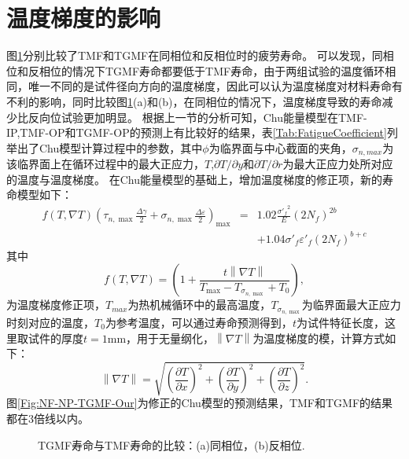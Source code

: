 \section{温度梯度的影响}
图\ref{Fig:plot_exp_fatigue_life_TMF_TGMF}分别比较了TMF和TGMF在同相位和反相位时的疲劳寿命。
可以发现，同相位和反相位的情况下TGMF寿命都要低于TMF寿命，由于两组试验的温度循环相同，唯一不同的是试件径向方向的温度梯度，因此可以认为温度梯度对材料寿命有不利的影响，同时比较图\ref{Fig:plot_exp_fatigue_life_TMF_TGMF}(a)和(b)，在同相位的情况下，温度梯度导致的寿命减少比反向位试验更加明显。
根据上一节的分析可知，Chu能量模型在TMF-IP,TMF-OP和TGMF-OP的预测上有比较好的结果，表\ref{Tab:FatigueCoefficient}列举出了Chu模型计算过程中的参数，其中$\phi$为临界面与中心截面的夹角，$\sigma_{n,max}$为该临界面上在循环过程中的最大正应力，$T$,$\partial T/\partial y$和$\partial T/\partial r$为最大正应力处所对应的温度与温度梯度。
在Chu能量模型的基础上，增加温度梯度的修正项，新的寿命模型如下：
\begin{eqnarray*}
f\left( {T,\nabla T} \right) {\left( {{\tau _{n,\max }}\frac{{\Delta \gamma }}{2} + {\sigma _{n,\max }}\frac{{\Delta \varepsilon }}{2}} \right)_{\max }} &=& 1.02\frac{{{{\sigma '}_f}^2}}{E}{\left( {2{N_f}} \right)^{2b}} \\
&& + 1.04{{\sigma '}_f}{{\varepsilon '}_f}{\left( {2{N_f}} \right)^{b + c}}
\end{eqnarray*}
其中
\begin{equation}
f\left( {T,\nabla T} \right) = \left( {1 + \frac{{t\left\| {\nabla T} \right\|}}{{{T_{\max }} - {T_{{\sigma _{n,\max }}}} + {T_0}}}} \right),
\end{equation}
为温度梯度修正项，$T_{max}$为热机械循环中的最高温度，${T_{{\sigma _{n,\max }}}}$为临界面最大正应力时刻对应的温度，$T_0$为参考温度，可以通过寿命预测得到，$t$为试件特征长度，这里取试件的厚度$t=1$mm，用于无量纲化，${\left\| {\nabla T} \right\|}$为温度梯度的模，计算方式如下：
\begin{equation}
\left\| {\nabla T} \right\| = \sqrt {{{\left( {\frac{{\partial T}}{{\partial x}}} \right)}^2} + {{\left( {\frac{{\partial T}}{{\partial y}}} \right)}^2} + {{\left( {\frac{{\partial T}}{{\partial z}}} \right)}^2}}.
\end{equation}
图\ref{Fig:NF-NP-TGMF-Our}为修正的Chu模型的预测结果，TMF和TGMF的结果都在3倍线以内。

\begin{figure}
  \caption{TGMF寿命与TMF寿命的比较：(a)同相位，(b)反相位.}
  \label{Fig:plot_exp_fatigue_life_TMF_TGMF}
\end{figure}

